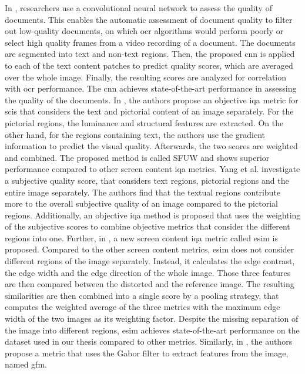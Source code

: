 In \cite{ocr_cnn_docu_2014}, researchers use a convolutional neural network to assess the quality of documents.
This enables the automatic assessment of document quality to filter out low-quality documents, on which \gls{ocr} algorithms would perform poorly or select high quality frames from a video recording of a document.
The documents are segmented into text and non-text regions.
Then, the proposed \gls{cnn} is applied to each of the text content patches to predict quality scores, which are averaged over the whole image.
Finally, the resulting scores are analyzed for correlation with \gls{ocr} performance.
The \gls{cnn} achieves state-of-the-art performance in assessing the quality of the documents.
In \cite{text_pict_weight_2017}, the authors propose an objective \gls{iqa} metric for \glspl{sci} that considers the text and pictorial content of an image separately.
For the pictorial regions, the luminance and structural features are extracted.
On the other hand, for the regions containing text, the authors use the gradient information to predict the visual quality.
Afterwards, the two scores are weighted and combined.
The proposed method is called SFUW and shows superior performance compared to other screen content \gls{iqa} metrics.
Yang et al. \cite{3_subj_weight_2015} investigate a subjective quality score, that considers text regions, pictorial regions and the entire image separately.
The authors find that the textual regions contribute more to the overall subjective quality of an image compared to the pictorial regions.
Additionally, an objective \gls{iqa} method is proposed that uses the weighting of the subjective scores to combine objective metrics that consider the different regions into one.
Further, in \cite{ni_esim_2017}, a new screen content \gls{iqa} metric called \gls{esim} is proposed.
Compared to the other screen content metrics, \gls{esim} does not consider different regions of the image separately.
Instead, it calculates the edge contrast, the edge width and the edge direction of the whole image.
Those three features are then compared between the distorted and the reference image.
The resulting similarities are then combined into a single score by a pooling strategy, that computes the weighted average of the three metrics with the maximum edge width of the two images as its weighting factor.
Despite the missing separation of the image into different regions, \gls{esim} achieves state-of-the-art performance on the dataset used in our thesis compared to other metrics.
Similarly, in \cite{iqa_sci_gabor_2018}, the authors propose a metric that uses the Gabor filter to extract features from the image, named \gls{gfm}.
